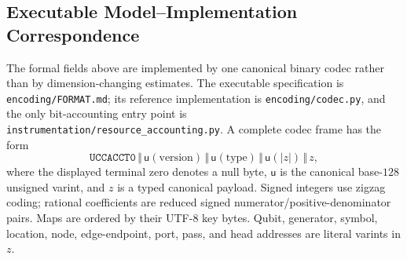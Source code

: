 \subsection{Executable Model--Implementation Correspondence}
\label{sec:model-implementation-mapping}

The formal fields above are implemented by one canonical binary codec rather
than by dimension-changing estimates.  The executable specification is
\texttt{encoding/FORMAT.md}; its reference implementation is
\texttt{encoding/codec.py}, and the only bit-accounting entry point is
\texttt{instrumentation/resource\_accounting.py}.  A complete codec frame has
the form
\begin{equation}
 \mathtt{UCCACCT0}\,\Vert\,
 \mathsf u(\text{version})\,\Vert\,
 \mathsf u(\text{type})\,\Vert\,
 \mathsf u(|z|)\,\Vert\,z,
 \label{eq:executable-codec-frame}
\end{equation}
where the displayed terminal zero denotes a null byte, $\mathsf u$ is the
canonical base-$128$ unsigned varint, and $z$ is a typed canonical payload.
Signed integers use zigzag coding; rational coefficients are reduced signed
numerator/positive-denominator pairs.  Maps are ordered by their UTF-8 key
bytes.  Qubit, generator, symbol, location, node, edge-endpoint, port, pass,
and head addresses are literal varints in $z$.

